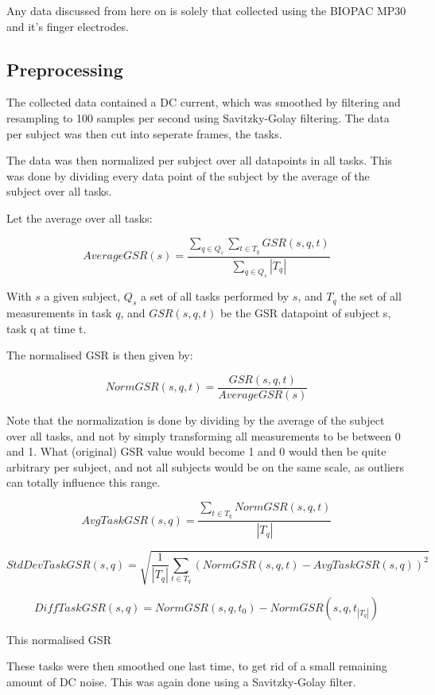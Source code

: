 \documentclass[12pt,leqno,letterpaper]{report} %
\begin{document}
Any data discussed from here on is solely that collected using the BIOPAC MP30 and it's finger electrodes.


\subsection{Preprocessing}
The collected data contained a DC current, which was smoothed by filtering and resampling to 100 samples per second using Savitzky-Golay filtering. 
The data per subject was then cut into seperate frames, the tasks. 

The data was then normalized per subject over all datapoints in all tasks. This was done by dividing every data point of the subject by the average of the subject over all tasks. 

Let the average over all tasks:


\[
AverageGSR(s) = \frac 
{\sum_{q \in Q_s}\sum_{t \in T_q} GSR(s,q,t)}
{ \sum_{q \in Q_s} \left\vert{T_q}\right\vert }
\]

With $s$ a given subject, $Q_s$ a set of all tasks performed by $s$, and $T_q$ the set of all measurements in task $q$, and $GSR(s,q,t)$ be the GSR datapoint of subject s, task q at time t.

The normalised GSR is then given by:

\[
NormGSR(s,q,t) = \frac{GSR(s,q,t)}{AverageGSR(s)}
\]

Note that the normalization is done by dividing by the average of the subject over all tasks, and not by simply transforming all measurements to be between 0 and 1. What (original) GSR value would become 1 and 0 would then be quite arbitrary per subject, and not all subjects would be on the same scale, as outliers can totally influence this range.






\[
AvgTaskGSR(s,q) = \frac { \sum_{t \in T_q} NormGSR(s,q,t) }
{\left\vert{T_q}\right\vert }
\]

\[
StdDevTaskGSR(s,q) = \sqrt {\frac{1}{\left\vert{T_q}\right\vert}   \sum_{t \in T_q} (NormGSR(s,q,t) - AvgTaskGSR(s,q))^2 }
\]

\[
DiffTaskGSR(s,q) = NormGSR(s,q, t_0) - NormGSR(s,q, t_{\left\vert{T_q}\right\vert})
\]

This normalised GSR 


These tasks were then smoothed one last time, to get rid of a small remaining amount of DC noise. This was again done using a Savitzky-Golay filter.
\end{document}
